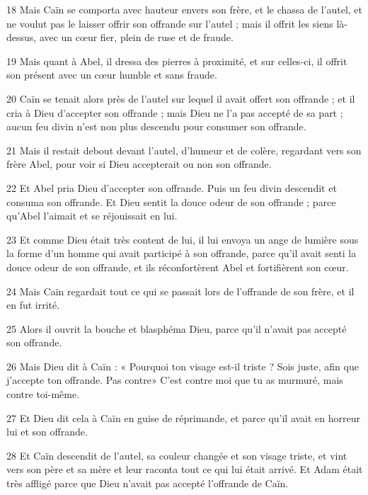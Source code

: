 \par 18 Mais Caïn se comporta avec hauteur envers son frère, et le chassa de l'autel, et ne voulut pas le laisser offrir son offrande sur l'autel ; mais il offrit les siens là-dessus, avec un cœur fier, plein de ruse et de fraude.

\par 19 Mais quant à Abel, il dressa des pierres à proximité, et sur celles-ci, il offrit son présent avec un cœur humble et sans fraude.

\par 20 Caïn se tenait alors près de l'autel sur lequel il avait offert son offrande ; et il cria à Dieu d'accepter son offrande ; mais Dieu ne l'a pas accepté de sa part ; aucun feu divin n’est non plus descendu pour consumer son offrande.

\par 21 Mais il restait debout devant l'autel, d'humeur et de colère, regardant vers son frère Abel, pour voir si Dieu accepterait ou non son offrande.

\par 22 Et Abel pria Dieu d'accepter son offrande. Puis un feu divin descendit et consuma son offrande. Et Dieu sentit la douce odeur de son offrande ; parce qu'Abel l'aimait et se réjouissait en lui.

\par 23 Et comme Dieu était très content de lui, il lui envoya un ange de lumière sous la forme d'un homme qui avait participé à son offrande, parce qu'il avait senti la douce odeur de son offrande, et ils réconfortèrent Abel et fortifièrent son cœur.

\par 24 Mais Caïn regardait tout ce qui se passait lors de l'offrande de son frère, et il en fut irrité.

\par 25 Alors il ouvrit la bouche et blasphéma Dieu, parce qu'il n'avait pas accepté son offrande.

\par 26 Mais Dieu dit à Caïn : « Pourquoi ton visage est-il triste ? Sois juste, afin que j'accepte ton offrande. Pas contre» C'est contre moi que tu as murmuré, mais contre toi-même.

\par 27 Et Dieu dit cela à Caïn en guise de réprimande, et parce qu'il avait en horreur lui et son offrande.

\par 28 Et Caïn descendit de l'autel, sa couleur changée et son visage triste, et vint vers son père et sa mère et leur raconta tout ce qui lui était arrivé. Et Adam était très affligé parce que Dieu n'avait pas accepté l'offrande de Caïn.

